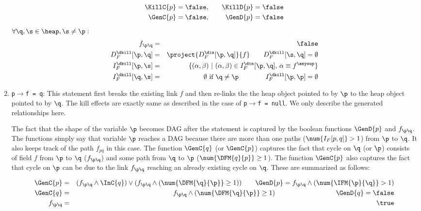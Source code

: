 \begin{enumerate}
\begin{eqnarray*}
  \KillC{p}  = \false, &\quad& \KillD{p} = \false \\
  \GenC{p} = \false, &\quad& \GenD{p} = \false  \\
\end{eqnarray*}
$\forall \q,\s \in \heap, \s \not= \p:$
\begin{eqnarray*}
  f_{\p\q} &=& \false \\
  D_F^{\dkill}[\p,\q] &=& \project{D_F^{\din}[\p,\q]}{f}
  \qquad
  D_F^{\dkill}[\s,\q]  = \emptyset \\
  I_F^{\dkill}[\p,\s] &=& \{(\alpha, \beta) \ \vert\ (\alpha,
  \beta) \in I_F^{\din}[\p, \q] \mbox,\ \alpha \equiv f^\anysup \} \\ 
  I_F^{\dkill}[\q,\s] &=& \emptyset \mbox{ if } \q \not= \p \qquad\qquad
  I_F^{\dkill}[\p,\p] = \emptyset 
\end{eqnarray*}

\item {\tt p$\rightarrow$f = q}: 
This statement first breaks
  the existing link $f$ and then re-links the the heap object
  pointed to by $\p$ to the heap object pointed to by
  $\q$. The kill effects are exactly same as described in the
  case of  {\tt p$\rightarrow$f = null}. We only describe the
  generated relationships here. 
  
 The fact that the shape of the variable $\p$
becomes DAG after the statement is captured by the boolean functions $\GenD{p}$ and
$f_{\p\q}$. The functions simply say that variable $\p$ reaches a DAG
because there are more than one paths ($\num{I_F[p,q]} > 1$)
from $\p$ to $\q$. It also keeps track of the path $f_{pq}$ in this case.
The function $\GenC{q}$ (or $\GenC{p}$)  captures the fact that cycle on $\q$ (or $\p$)
 consists of field $f$ from $\p$ to $\q$ ($f_{\p\q}$)
and some path from $\q$ to $\p$ ($\num{\DFM{q}{p}} \geq
1$). The function $\GenC{p}$ also captures the fact that cycle on $\p$
can be due to the link $f_{\p\q}$ reaching an already existing cycle on $\q$.
These are summarized as follows:

  \begin{eqnarray*}
    \GenC{p}   &= & (f_{\p\q} \wedge \InC{q}) \vee (f_{\p\q}
    \wedge (\num{\DFM{\q}{\p}} \geq 1)) \qquad 
    \GenD{p}   =  f_{\p\q} \wedge (\num{\IFM{\p}{\q}} > 1)	\\
    \GenC{q}   &= & f_{\p\q} \wedge (\num{\DFM{\q}{\p}}
    \geq 1) \qquad\qquad\qquad\qquad\quad \GenD{q} = \false\\ 
    f_{\p\q} &=& \true \\
  \end{eqnarray*}


\end{enumerate}
